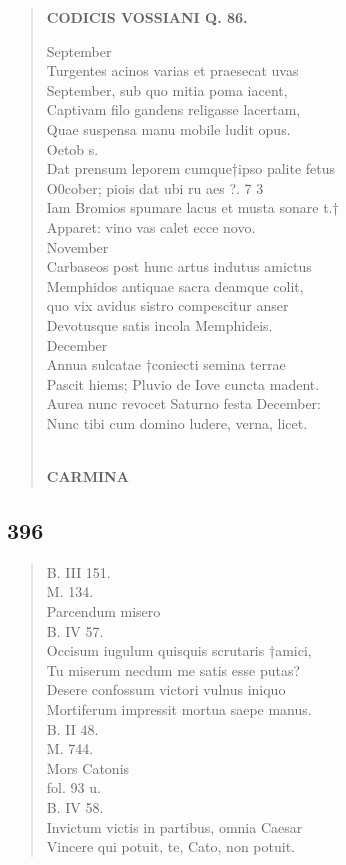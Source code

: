 \documentclass[11pt, a4paper]{report}
\begin{document}
\begin{verse}
    \begin{center} \textbf{CODICIS VOSSIANI Q. 86.} \end{center} \marginpar{[311]} September \\ Turgentes acinos varias et praesecat uvas \\ September, sub quo mitia poma iacent, \\ Captivam filo gandens religasse lacertam, \\ Quae suspensa manu mobile ludit opus. \\ Oetob s. \\ Dat prensum leporem cumque†ipso palite fetus \\ O0cober; piois dat ubi ru aes ?. 7 3 \\ Iam Bromios spumare lacus et musta sonare t.† \\ Apparet: vino vas calet ecce novo. \\ November \\ Carbaseos post hunc artus indutus amictus \\ Memphidos antiquae sacra deamque colit, \\ quo vix avidus sistro compescitur anser \\ Devotusque satis incola Memphideis. \\ December \\ Annua sulcatae †coniecti semina terrae \\ Pascit hiems; Pluvio de Iove cuncta madent. \\ Aurea nunc revocet Saturno festa December: \\ Nunc tibi cum domino ludere, verna, licet. \\ 
        ﻿\pagebreak 
    \begin{center} \textbf{CARMINA} \end{center} \marginpar{[312]} 
      \end{verse}
  
            \subsection*{396}
      \begin{verse}
      B. III 151. \\ M. 134. \\ Parcendum misero \\ B. IV 57. \\ Occisum iugulum quisquis scrutaris †amici, \\ Tu miserum necdum me satis esse putas? \\ Desere confossum victori vulnus iniquo \\ Mortiferum impressit mortua saepe manus. \\ B. II 48. \\ M. 744. \\ Mors Catonis \\ fol. 93 u. \\ B. IV 58. \\ Invictum victis in partibus, omnia Caesar \\ Vincere qui potuit, te, Cato, non potuit. \\ 
      \end{verse}
  
\end{document}
